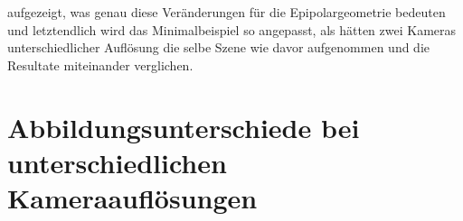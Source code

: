 aufgezeigt, was genau diese Veränderungen für die Epipolargeometrie bedeuten und letztendlich wird das Minimalbeispiel so angepasst, als hätten zwei Kameras unterschiedlicher Auflösung die selbe Szene wie davor aufgenommen und die Resultate miteinander verglichen. 

\section{Abbildungsunterschiede bei unterschiedlichen Kameraauflösungen}

%
%
%
%
%
%
%
